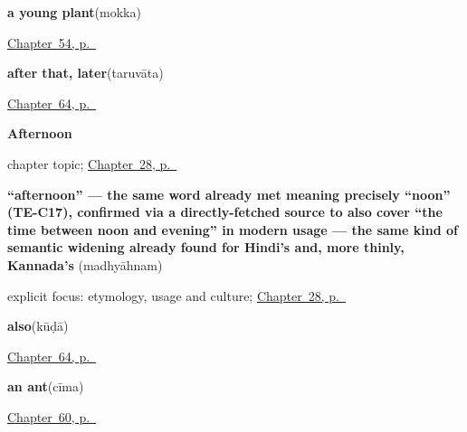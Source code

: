 \noindent\begin{minipage}[t]{\linewidth}
\raggedright
\textbf{a young plant}\enspace\emph{}\enspace(mokka)\par
\footnotesize \hyperref[ch:te-tree]{Chapter~54, p.~\pageref*{ch:te-tree}}
\end{minipage}\par\smallskip

\noindent\begin{minipage}[t]{\linewidth}
\raggedright
\textbf{after that, later}\enspace\emph{}\enspace(taruvāta)\par
\footnotesize \hyperref[ch:te-joining-words]{Chapter~64, p.~\pageref*{ch:te-joining-words}}
\end{minipage}\par\smallskip

\noindent\begin{minipage}[t]{\linewidth}
\raggedright
\textbf{Afternoon}\par
\footnotesize chapter topic; \hyperref[ch:te-afternoon]{Chapter~28, p.~\pageref*{ch:te-afternoon}}
\end{minipage}\par\smallskip

\noindent\begin{minipage}[t]{\linewidth}
\raggedright
\textbf{\textquotedblleft{}afternoon\textquotedblright{} — the same word already met meaning precisely \textquotedblleft{}noon\textquotedblright{} (TE-C17), confirmed via a directly-fetched source to also cover \textquotedblleft{}the time between noon and evening\textquotedblright{} in modern usage — the same kind of semantic widening already found for Hindi's  and, more thinly, Kannada's }\enspace\emph{}\enspace(madhyāhnam)\par
\footnotesize explicit focus: etymology, usage and culture; \hyperref[ch:te-afternoon]{Chapter~28, p.~\pageref*{ch:te-afternoon}}
\end{minipage}\par\smallskip

\noindent\begin{minipage}[t]{\linewidth}
\raggedright
\textbf{also}\enspace\emph{}\enspace(kūḍā)\par
\footnotesize \hyperref[ch:te-joining-words]{Chapter~64, p.~\pageref*{ch:te-joining-words}}
\end{minipage}\par\smallskip

\noindent\begin{minipage}[t]{\linewidth}
\raggedright
\textbf{an ant}\enspace\emph{}\enspace(cīma)\par
\footnotesize \hyperref[ch:te-animals]{Chapter~60, p.~\pageref*{ch:te-animals}}
\end{minipage}\par\smallskip


